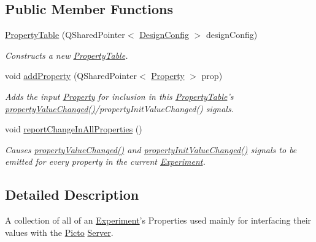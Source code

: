 \subsection*{Public Member Functions}
\begin{DoxyCompactItemize}
\item 
\hyperlink{class_picto_1_1_property_table_a7a34fa24c436765ad039e9efbfdd2320}{Property\-Table} (Q\-Shared\-Pointer$<$ \hyperlink{class_picto_1_1_design_config}{Design\-Config} $>$ design\-Config)
\begin{DoxyCompactList}\small\item\em Constructs a new \hyperlink{class_picto_1_1_property_table}{Property\-Table}. \end{DoxyCompactList}\item 
void \hyperlink{class_picto_1_1_property_table_aa48dc61b2d97049641d13a66c556168a}{add\-Property} (Q\-Shared\-Pointer$<$ \hyperlink{class_picto_1_1_property}{Property} $>$ prop)
\begin{DoxyCompactList}\small\item\em Adds the input \hyperlink{class_picto_1_1_property}{Property} for inclusion in this \hyperlink{class_picto_1_1_property_table}{Property\-Table}'s \hyperlink{class_picto_1_1_property_table_a7a0ab3ba84131726281eabe4994a6f8a}{property\-Value\-Changed()}/property\-Init\-Value\-Changed() signals. \end{DoxyCompactList}\item 
void \hyperlink{class_picto_1_1_property_table_a08cf0cbde824362475783b2970000d1d}{report\-Change\-In\-All\-Properties} ()
\begin{DoxyCompactList}\small\item\em Causes \hyperlink{class_picto_1_1_property_table_a7a0ab3ba84131726281eabe4994a6f8a}{property\-Value\-Changed()} and \hyperlink{class_picto_1_1_property_table_a7ea020fb16e6b5182c682ab04be99581}{property\-Init\-Value\-Changed()} signals to be emitted for every property in the current \hyperlink{class_picto_1_1_experiment}{Experiment}. \end{DoxyCompactList}\end{DoxyCompactItemize}


\subsection{Detailed Description}
A collection of all of an \hyperlink{class_picto_1_1_experiment}{Experiment}'s Properties used mainly for interfacing their values with the \hyperlink{namespace_picto}{Picto} \hyperlink{class_server}{Server}. 

